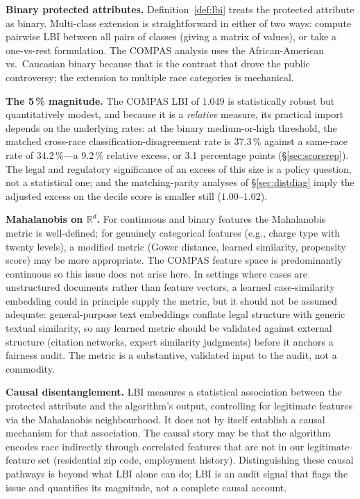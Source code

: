 \documentclass[11pt]{article}
\begin{document}
\textbf{Binary protected attributes.} Definition~\ref{def:lbi} treats
the protected attribute as binary. Multi-class extension is
straightforward in either of two ways: compute pairwise LBI between
all pairs of classes (giving a matrix of values), or take a
one-vs-rest formulation. The COMPAS analysis uses the
African-American vs.\ Caucasian binary because that is the contrast
that drove the public controversy; the extension to multiple race
categories is mechanical.

\textbf{The 5\,\% magnitude.} The COMPAS LBI of $1.049$ is
statistically robust but quantitatively modest, and because it is a
\emph{relative} measure, its practical import depends on the
underlying rates: at the binary medium-or-high threshold, the
matched cross-race classification-disagreement rate is
37.3\,\% against a same-race rate of 34.2\,\%---a
9.2\,\% relative excess, or 3.1 percentage points
(\S\ref{sec:scorerep}). The legal and regulatory significance of an
excess of this size is a policy question, not a statistical one; and
the matching-parity analyses of \S\ref{sec:distdiag} imply the
adjusted excess on the decile score is smaller still
($1.00$--$1.02$).

\textbf{Mahalanobis on $\mathbb{R}^d$.} For continuous and binary
features the Mahalanobis metric is well-defined; for genuinely
categorical features (e.g., charge type with twenty levels), a
modified metric (Gower distance, learned similarity, propensity
score) may be more appropriate. The COMPAS feature space is
predominantly continuous so this issue does not arise here. In
settings where cases are unstructured documents rather than feature
vectors, a learned case-similarity embedding could in principle
supply the metric, but it should not be assumed adequate:
general-purpose text embeddings conflate legal structure with
generic textual similarity, so any learned metric should be
validated against external structure (citation networks, expert
similarity judgments) before it anchors a fairness audit. The
metric is a substantive, validated input to the audit, not a
commodity.

\textbf{Causal disentanglement.} LBI measures a statistical
association between the protected attribute and the algorithm's
output, controlling for legitimate features via the Mahalanobis
neighbourhood. It does not by itself establish a causal mechanism
for that association. The causal story may be that the algorithm
encodes race indirectly through correlated features that are not
in our legitimate-feature set (residential zip code, employment
history). Distinguishing these causal pathways is beyond what LBI
alone can do; LBI is an audit signal that flags the issue and
quantifies its magnitude, not a complete causal account.
\end{document}
